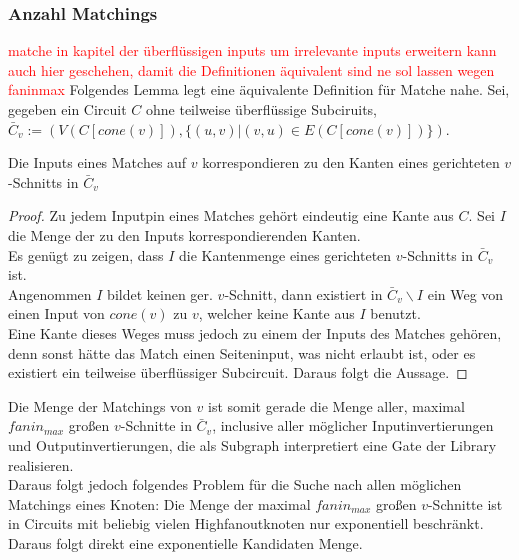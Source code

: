\documentclass[11pt, a4paper, german]{article}
\begin{document}
\subsubsection{Anzahl Matchings}
\label{subsubsec:anzahl_matchings}
\textcolor{red}{matche in kapitel der überflüssigen inputs um irrelevante inputs erweitern kann auch hier geschehen, damit die Definitionen äquivalent sind ne sol lassen wegen faninmax}
Folgendes Lemma legt eine äquivalente Definition für Matche nahe.
Sei, gegeben ein Circuit $C$ ohne teilweise überflüssige Subciruits, \\$\bar{C}_v := (V(C[cone(v)]), \{ (u,v) | (v,u) \in E(C[cone(v)])\})$. 
\begin{lemma}{Die Inputs eines Matches auf $v$ korrespondieren zu den Kanten eines gerichteten $v$-Schnitts in $\bar{C}_v $}
\end{lemma}
\begin{proof}
Zu jedem Inputpin eines Matches gehört eindeutig eine Kante aus $C$. Sei $I$ die Menge der zu den Inputs korrespondierenden Kanten.\\ 
Es genügt zu zeigen, dass $I$ die Kantenmenge eines gerichteten $v$-Schnitts in $\bar{C}_v$ ist. \\
Angenommen $I$ bildet keinen ger. $v$-Schnitt, dann existiert in $\bar{C}_v\backslash I$ ein Weg von einen Input von $cone(v)$ zu $v$, welcher keine Kante aus $I$ benutzt. \\
Eine Kante dieses Weges muss jedoch zu einem der Inputs des Matches gehören, denn sonst hätte das Match einen Seiteninput, was nicht erlaubt ist, oder es existiert ein teilweise überflüssiger Subcircuit. Daraus folgt die Aussage. 
\end{proof}
Die Menge der Matchings von $v$ ist somit gerade die Menge aller, maximal $fanin_{max}$ großen $v$-Schnitte in $\bar{C}_v$, inclusive aller möglicher Inputinvertierungen und Outputinvertierungen, die als Subgraph interpretiert eine Gate der Library realisieren.\\
Daraus folgt jedoch folgendes Problem für die Suche nach allen möglichen Matchings eines Knoten: Die Menge der maximal $fanin_{max}$ großen $v$-Schnitte ist in Circuits mit beliebig vielen Highfanoutknoten nur exponentiell beschränkt.\\
Daraus folgt direkt eine exponentielle Kandidaten Menge.
\end{document}
